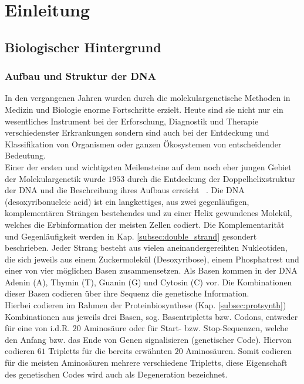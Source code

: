 \chapter{Einleitung} \label{sec:introduction}
\section{Biologischer Hintergrund} \label{sec:biology}
\subsection{Aufbau und Struktur der DNA} \label{subsec:dna}

In den vergangenen Jahren wurden durch die molekulargenetische Methoden in Medizin und Biologie enorme Fortschritte erzielt. Heute sind sie nicht nur ein wesentliches Instrument bei der Erforschung, Diagnostik und Therapie verschiedenster Erkrankungen sondern sind auch bei der Entdeckung und Klassifikation von Organismen oder ganzen Ökosystemen von entscheidender Bedeutung.  \\


Einer der ersten und wichtigsten Meilensteine auf dem noch eher jungen Gebiet der Molekulargenetik wurde $1953$ durch die Entdeckung der Doppelhelixstruktur der DNA und die Beschreibung ihres Aufbaus erreicht ~\cite{watson_1953}. Die DNA (desoxyribonucleic acid) ist ein langkettiges, aus zwei gegenläufigen, komplementären Strängen bestehendes und zu einer Helix gewundenes Molekül, welches die Erbinformation der meisten Zellen codiert. Die Komplementarität und Gegenläufigkeit werden in Kap. \ref{subsec:double_strand} gesondert beschrieben. Jeder Strang besteht aus vielen aneinandergereihten Nukleotiden, die sich jeweils aus einem Zuckermolekül (Desoxyribose), einem Phosphatrest und einer von vier möglichen Basen zusammensetzen. Als Basen kommen in der DNA Adenin (A), Thymin (T), Guanin (G) und Cytosin (C) vor. Die Kombinationen dieser Basen codieren über ihre Sequenz die genetische Information.  \\

Hierbei codieren im Rahmen der Proteinbiosynthese (Kap. \ref{subsec:protsynth}) Kombinationen aus jeweils drei Basen, sog. Basentripletts bzw. Codons, entweder für eine von i.d.R. $ 20 $ Aminosäure \cite{martin_1961, matthaei_1961} oder für Start- bzw. Stop-Sequenzen, welche den Anfang bzw. das Ende von Genen signalisieren (genetischer Code). Hiervon codieren $ 61 $ Tripletts für die bereits erwähnten $ 20 $ Aminosäuren. Somit codieren für die meisten Aminosäuren mehrere verschiedene Tripletts, diese Eigenschaft des genetischen Codes wird auch als Degeneration bezeichnet. \\

